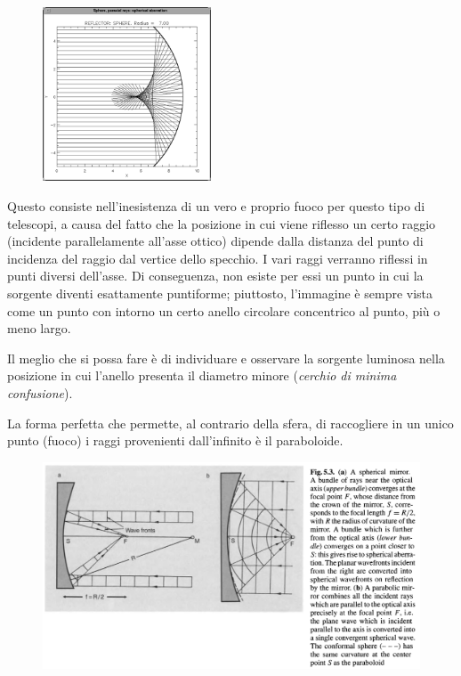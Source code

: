 \begin{minipage}{0.345\textwidth}
    \begin{figure}[H]
        \centering
        \includegraphics[width=5cm]{immagini/aberrazione_sferica.png}
    \end{figure}
\end{minipage}
\begin{minipage}{0.65\textwidth}
    \vspace{0.5cm}Questo consiste nell'inesistenza di un vero e proprio fuoco per questo tipo di telescopi, a causa del fatto che la posizione in cui viene riflesso un certo raggio (incidente parallelamente all'asse ottico) dipende dalla distanza del punto di incidenza del raggio dal vertice dello specchio. I vari raggi verranno riflessi in punti diversi dell'asse. Di conseguenza, non esiste per essi un punto in cui la sorgente diventi esattamente puntiforme; piuttosto, l'immagine è sempre vista come un punto con intorno un certo anello circolare concentrico al punto, più o meno largo.
\end{minipage}

\vspace{0.2cm}Il meglio che si possa fare è di individuare e osservare la sorgente luminosa nella posizione in cui l'anello presenta il diametro minore (\textit{cerchio di minima confusione}).

La forma perfetta che permette, al contrario della sfera, di raccogliere in un unico punto (fuoco) i raggi provenienti dall'infinito è il paraboloide.

\begin{figure}[H]
    \centering
    \includegraphics[width=14cm]{immagini/sfera_vs_paraboloide.png}
\end{figure}

